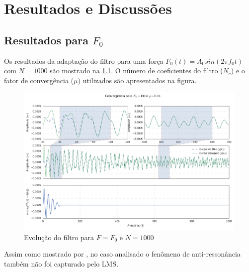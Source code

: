 \chapter{Resultados e Discussões}

\section{Resultados para $ F_0 $}

Os resultados da adaptação do filtro para uma força $F_0(t) = A_0 sin(2\pi f_0 t)$ com $ N=1000 $ são mostrado na \cref{fig:F0_1000_90_conv}. O número de coeficientes do filtro ($ N_c $) e o fator de convergência ($ \mu $) utilizados são apresentados na figura.

\begin{figure}[!h]
	\centering
	\includegraphics[scale=0.7]{IMGS/F0_1000_90_conv}
	\caption{Evolução do filtro para $ F=F_0 $ e $ N=1000 $}
	\label{fig:F0_1000_90_conv}
\end{figure}

Assim como mostrado por \citet{castello2005experimental}, no caso analisado o fenômeno de anti-ressonância também não foi capturado pelo LMS.